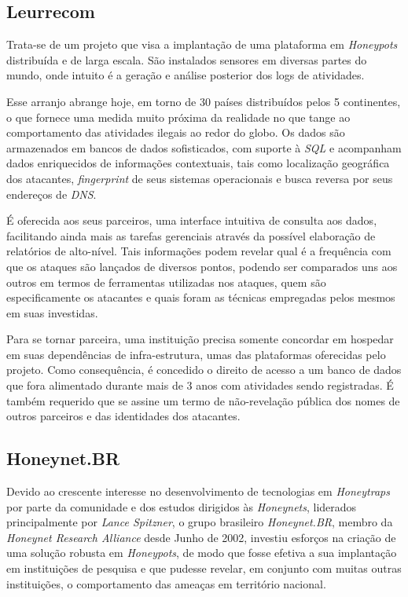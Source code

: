 \subsection{Leurrecom}


Trata-se de um projeto que visa a implantação de uma plataforma em \textit{Honeypots} distribuída e de larga escala. São instalados sensores em diversas partes do mundo, onde intuito é a geração e análise posterior dos logs de atividades. \cite{Leurre}

Esse arranjo abrange hoje, em torno de 30 países distribuídos pelos 5 continentes, o que fornece uma medida muito próxima da realidade no que tange ao comportamento das atividades ilegais ao redor do globo. Os dados são armazenados em bancos de dados sofisticados, com suporte à \textit{SQL} e acompanham dados enriquecidos de informações contextuais, tais como localização geográfica dos atacantes, \textit{fingerprint} de seus sistemas operacionais e busca reversa por seus endereços de \textit{DNS}.

É oferecida aos seus parceiros, uma interface intuitiva de consulta aos dados, facilitando ainda mais as tarefas gerenciais através da possível elaboração de relatórios de alto-nível. Tais informações podem revelar qual é a frequência com que os ataques são lançados de diversos pontos, podendo ser comparados uns aos outros em termos de ferramentas utilizadas nos ataques, quem são especificamente os atacantes e quais foram as técnicas empregadas pelos mesmos em suas investidas.

Para se tornar parceira, uma instituição precisa somente concordar em hospedar em suas dependências de infra-estrutura, umas das plataformas oferecidas pelo projeto. Como consequência, é concedido o direito de acesso a um banco de dados que fora alimentado durante mais de 3 anos com atividades sendo registradas. É também requerido que se assine um termo de não-revelação pública dos nomes de outros parceiros e das identidades dos atacantes.


\subsection{Honeynet.BR}


Devido ao crescente interesse no desenvolvimento de tecnologias em \textit{Honeytraps} por parte da comunidade e dos estudos dirigidos às \textit{Honeynets}, liderados principalmente por \textit{Lance Spitzner}, o grupo brasileiro \textit{Honeynet.BR}, membro da \textit{Honeynet Research Alliance} desde Junho de 2002, investiu esforços na criação de uma solução robusta em \textit{Honeypots}, de modo que fosse efetiva a sua implantação em instituições de pesquisa e que pudesse revelar, em conjunto com muitas outras instituições, o comportamento das ameaças em território nacional.

